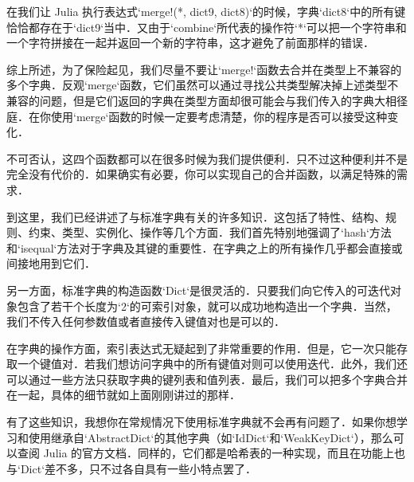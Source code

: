 在我们让 Julia 执行表达式`merge!(*, dict9, dict8)`的时候，字典`dict8`中的所有键恰恰都存在于`dict9`当中．又由于`combine`所代表的操作符`*`可以把一个字符串和一个字符拼接在一起并返回一个新的字符串，这才避免了前面那样的错误．

综上所述，为了保险起见，我们尽量不要让`merge!`函数去合并在类型上不兼容的多个字典．反观`merge`函数，它们虽然可以通过寻找公共类型解决掉上述类型不兼容的问题，但是它们返回的字典在类型方面却很可能会与我们传入的字典大相径庭．在你使用`merge`函数的时候一定要考虑清楚，你的程序是否可以接受这种变化．

不可否认，这四个函数都可以在很多时候为我们提供便利．只不过这种便利并不是完全没有代价的．如果确实有必要，你可以实现自己的合并函数，以满足特殊的需求．

到这里，我们已经讲述了与标准字典有关的许多知识．这包括了特性、结构、规则、约束、类型、实例化、操作等几个方面．我们首先特别地强调了`hash`方法和`isequal`方法对于字典及其键的重要性．在字典之上的所有操作几乎都会直接或间接地用到它们．

另一方面，标准字典的构造函数`Dict`是很灵活的．只要我们向它传入的可迭代对象包含了若干个长度为`2`的可索引对象，就可以成功地构造出一个字典．当然，我们不传入任何参数值或者直接传入键值对也是可以的．

在字典的操作方面，索引表达式无疑起到了非常重要的作用．但是，它一次只能存取一个键值对．若我们想访问字典中的所有键值对则可以使用迭代．此外，我们还可以通过一些方法只获取字典的键列表和值列表．最后，我们可以把多个字典合并在一起，具体的细节就如上面刚刚讲过的那样．

有了这些知识，我想你在常规情况下使用标准字典就不会再有问题了．如果你想学习和使用继承自`AbstractDict`的其他字典（如`IdDict`和`WeakKeyDict`），那么可以查阅 Julia 的官方文档．同样的，它们都是哈希表的一种实现，而且在功能上也与`Dict`差不多，只不过各自具有一些小特点罢了．
